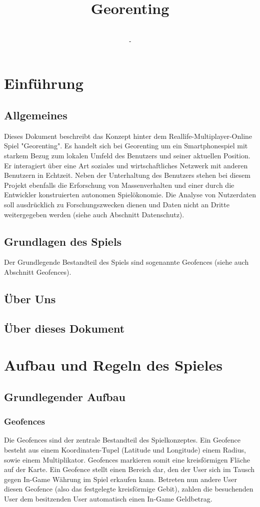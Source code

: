 \documentclass{scrreprt}
\title{Georenting}
\author{\gitAuthors}
\date{\revisiondate\\
  \texttt{\gitTag-\revision}}
\begin{document}
\maketitle

\tableofcontents


\chapter{Einführung}
\section{Allgemeines}
Dieses Dokument beschreibt das Konzept hinter dem Reallife-Multiplayer-Online Spiel "Georenting". Es handelt sich bei Georenting um ein Smartphonespiel mit starkem Bezug zum lokalen Umfeld des Benutzers und seiner aktuellen Position. Er interagiert über eine Art soziales und wirtschaftliches Netzwerk mit anderen Benutzern in Echtzeit. Neben der Unterhaltung des Benutzers stehen bei diesem Projekt ebenfalls die Erforschung von Massenverhalten und einer durch die Entwickler konstruierten autonomen Spielökonomie. Die Analyse von Nutzerdaten soll ausdrücklich zu Forschungszwecken dienen und Daten nicht an Dritte weitergegeben werden (siehe auch Abschnitt Datenschutz).
\section{Grundlagen des Spiels}
Der Grundlegende Bestandteil des Spiels sind sogenannte Geofences (siehe auch Abschnitt Geofences).
\section{Über Uns}
\section{Über dieses Dokument}

\chapter{Aufbau und Regeln des Spieles}
\section{Grundlegender Aufbau}
\subsection{Geofences}
Die Geofences sind der zentrale Bestandteil des Spielkonzeptes. Ein Geofence besteht aus einem Koordinaten-Tupel (Latitude und Longitude) einem Radius, sowie einem Multiplikator. Geofences markieren somit eine kreisförmigen Fläche auf der Karte.
Ein Geofence stellt einen Bereich dar, den der User sich im Tausch gegen In-Game Währung im Spiel erkaufen kann. Betreten nun andere User diesen Geofence (also das festgelegte kreisförmige Gebit), zahlen die besuchenden User dem besitzenden User automatisch einen In-Game Geldbetrag.\\
\end{document}
